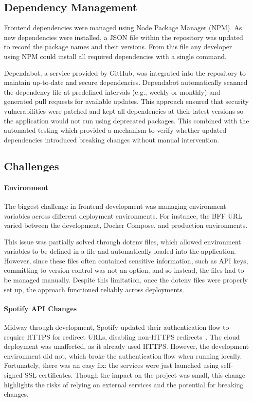 \subsection{Dependency Management}
Frontend dependencies were managed using Node Package Manager (NPM). As new dependencies were installed, a JSON file within the repository was updated to record the package names and their versions. From this file any developer using NPM could install all required dependencies with a single command.

Dependabot, a service provided by GitHub, was integrated into the repository to maintain up-to-date and secure dependencies. Dependabot automatically scanned the dependency file at predefined intervals (e.g., weekly or monthly) and generated pull requests for available updates. This approach ensured that security vulnerabilities were patched and kept all dependencies at their latest versions so the application would not run using deprecated packages. This combined with the automated testing which provided a mechanism to verify whether updated dependencies introduced breaking changes without manual intervention.

\subsection{Challenges}
\paragraph{Environment}
The biggest challenge in frontend development was managing environment variables across different deployment environments. For instance, the BFF URL varied between the development, Docker Compose, and production environments.

This issue was partially solved through dotenv files, which allowed environment variables to be defined in a file and automatically loaded into the application. However, since these files often contained sensitive information, such as API keys, committing to version control was not an option, and so instead, the files had to be managed manually. Despite this limitation, once the dotenv files were properly set up, the approach functioned reliably across deployments.

\paragraph{Spotify API Changes}
Midway through development, Spotify updated their authentication flow to require HTTPS for redirect URLs, disabling non-HTTPS redirects~\cite{spotifyredirects}. The cloud deployment was unaffected, as it already used HTTPS. However, the development environment did not, which broke the authentication flow when running locally. Fortunately, there was an easy fix: the services were just launched using self-signed SSL certificates. Though the impact on the project was small, this change highlights the risks of relying on external services and the potential for breaking changes.

